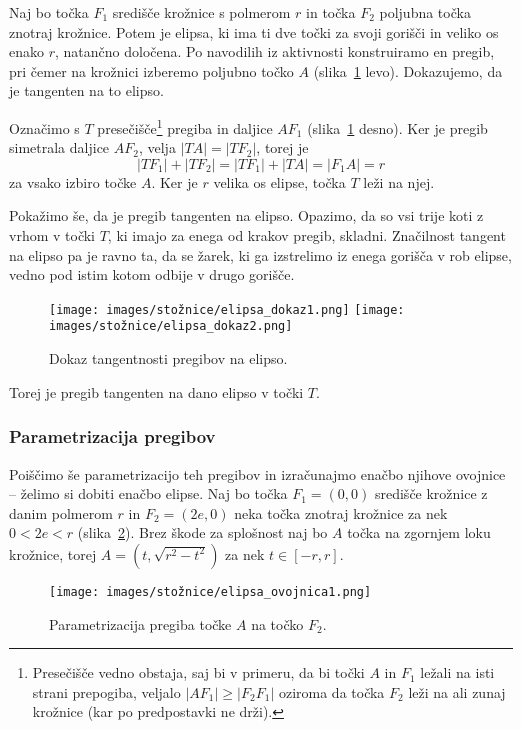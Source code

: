 \begin{dokaz}
    Naj bo točka $F_1$ središče krožnice s polmerom $r$ in točka $F_2$ poljubna točka znotraj krožnice. Potem je elipsa, ki ima ti dve točki za svoji gorišči in veliko os enako $r$, natančno določena. Po navodilih iz aktivnosti konstruiramo en pregib, pri čemer na krožnici izberemo poljubno točko $A$ (slika~\ref{fig:dokaz_elipsa} levo). Dokazujemo, da je tangenten na to elipso.

    Označimo s $T$ presečišče\footnote{Presečišče vedno obstaja, saj bi v primeru, da bi točki $A$ in $F_1$ ležali na isti strani prepogiba, veljalo $|AF_1| \geq |F_2F_1|$ oziroma da točka $F_2$ leži na ali zunaj krožnice (kar po predpostavki ne drži).} pregiba in daljice $AF_1$ (slika~\ref{fig:dokaz_elipsa} desno). Ker je pregib simetrala daljice $AF_2$, velja $|TA| = |TF_2|$, torej je
    $$|TF_1| + |TF_2| = |TF_1| + |TA| = |F_1A| = r$$
    za vsako izbiro točke $A$. Ker je $r$ velika os elipse, točka $T$ leži na njej.

    Pokažimo še, da je pregib tangenten na elipso. Opazimo, da so vsi trije koti z vrhom v točki $T$, ki imajo za enega od krakov pregib, skladni. Značilnost tangent na elipso pa je ravno ta, da se žarek, ki ga izstrelimo iz enega gorišča v rob elipse, vedno pod istim kotom odbije v drugo gorišče.
    \begin{figure}[h]
        \centering
        \texttt{[image: images/stožnice/elipsa\_dokaz1.png]}
        \texttt{[image: images/stožnice/elipsa\_dokaz2.png]}
        \caption[Tangentnost na elipso]{Dokaz tangentnosti pregibov na elipso.}
        \label{fig:dokaz_elipsa}
    \end{figure}
    Torej je pregib tangenten na dano elipso v točki $T$.
\end{dokaz}

\subsubsection*{Parametrizacija pregibov}

Poiščimo še parametrizacijo teh pregibov in izračunajmo enačbo njihove ovojnice -- želimo si dobiti enačbo elipse. Naj bo točka $F_1 = (0,0)$ središče krožnice z danim polmerom $r$ in $F_2 = (2e,0)$ neka točka znotraj krožnice za nek $0 < 2e < r$ (slika~\ref{fig:enacba_elipse}). Brez škode za splošnost naj bo $A$ točka na zgornjem loku krožnice, torej $A = (t, \sqrt{r^2-t^2})$ za nek $t \in [-r, r]$.
\begin{figure}[h]
    \centering
    \texttt{[image: images/stožnice/elipsa\_ovojnica1.png]}
    \caption[Enačba tangente na elipso]{Parametrizacija pregiba točke $A$ na točko $F_2$.}
    \label{fig:enacba_elipse}
\end{figure}

